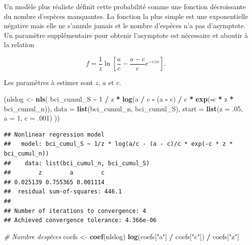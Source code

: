 \documentclass[
  11pt,
  american,
  a4paper,
  extrafontsizes,onecolumn,openright
  ]{memoir}
\newenvironment{Shaded}{\begin{snugshade}}{\end{snugshade}}
\newcommand{\AttributeTok}[1]{\textcolor[rgb]{0.13,0.29,0.53}{#1}}
\newcommand{\CommentTok}[1]{\textcolor[rgb]{0.56,0.35,0.01}{\textit{#1}}}
\newcommand{\DecValTok}[1]{\textcolor[rgb]{0.00,0.00,0.81}{#1}}
\newcommand{\FunctionTok}[1]{\textcolor[rgb]{0.13,0.29,0.53}{\textbf{#1}}}
\newcommand{\NormalTok}[1]{#1}
\newcommand{\OtherTok}[1]{\textcolor[rgb]{0.56,0.35,0.01}{#1}}
\newcommand{\SpecialCharTok}[1]{\textcolor[rgb]{0.81,0.36,0.00}{\textbf{#1}}}
\newcommand{\StringTok}[1]{\textcolor[rgb]{0.31,0.60,0.02}{#1}}
\begin{document}
Un modèle plus réaliste définit cette probabilité comme une fonction décroissante du nombre d'espèces manquantes.
La fonction la plus simple est une exponentielle négative mais elle ne s'annule jamais et le nombre d'espèces n'a pas d'asymptote.
Un paramètre supplémentaire pour obtenir l'asymptote est nécessaire et aboutir à la relation

\begin{equation} 
  \label{eq:Soberon1993b}
  f = \frac{1}{z} \ln \left[ \frac{a}{c} - \frac{a-c}{c} e^{-czn} \right].
\end{equation}

Les paramètres à estimer sont \(z\), \(a\) et \(c\).

\scriptsize

\begin{Shaded}
\begin{Highlighting}[]
\NormalTok{(nlslog }\OtherTok{\textless{}{-}} \FunctionTok{nls}\NormalTok{(}
\NormalTok{  bci\_cumul\_S }\SpecialCharTok{\textasciitilde{}} \DecValTok{1} \SpecialCharTok{/}\NormalTok{ z }\SpecialCharTok{*} \FunctionTok{log}\NormalTok{(a }\SpecialCharTok{/}\NormalTok{ c }\SpecialCharTok{{-}}\NormalTok{ (a }\SpecialCharTok{{-}}\NormalTok{ c) }\SpecialCharTok{/}\NormalTok{ c }\SpecialCharTok{*} \FunctionTok{exp}\NormalTok{(}\SpecialCharTok{{-}}\NormalTok{c }\SpecialCharTok{*}\NormalTok{ z }\SpecialCharTok{*}\NormalTok{ bci\_cumul\_n)), }
  \AttributeTok{data =} \FunctionTok{list}\NormalTok{(bci\_cumul\_n, bci\_cumul\_S), }
  \AttributeTok{start =} \FunctionTok{list}\NormalTok{(}\AttributeTok{z =}\NormalTok{ .}\DecValTok{05}\NormalTok{, }\AttributeTok{a =} \DecValTok{1}\NormalTok{, }\AttributeTok{c =}\NormalTok{ .}\DecValTok{001}\NormalTok{)}
\NormalTok{))}
\end{Highlighting}
\end{Shaded}

\begin{verbatim}
## Nonlinear regression model
##   model: bci_cumul_S ~ 1/z * log(a/c - (a - c)/c * exp(-c * z * bci_cumul_n))
##    data: list(bci_cumul_n, bci_cumul_S)
##        z        a        c 
## 0.025139 0.755365 0.001114 
##  residual sum-of-squares: 446.1
## 
## Number of iterations to convergence: 4 
## Achieved convergence tolerance: 4.366e-06
\end{verbatim}

\begin{Shaded}
\begin{Highlighting}[]
\CommentTok{\# Nombre d\textquotesingle{}espèces}
\NormalTok{coefs }\OtherTok{\textless{}{-}} \FunctionTok{coef}\NormalTok{(nlslog)}
\FunctionTok{log}\NormalTok{(coefs[}\StringTok{"a"}\NormalTok{] }\SpecialCharTok{/}\NormalTok{ coefs[}\StringTok{"c"}\NormalTok{]) }\SpecialCharTok{/}\NormalTok{ coefs[}\StringTok{"z"}\NormalTok{]}
\end{Highlighting}
\end{Shaded}
\end{document}
